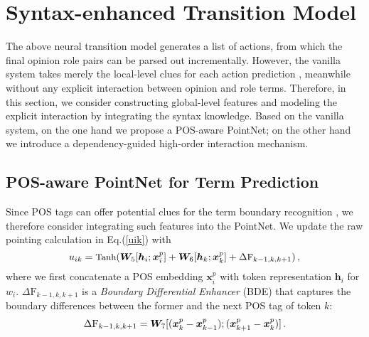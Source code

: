 \documentclass[letterpaper]{article} \usepackage{aaai22}  \usepackage{times}  \usepackage{helvet}  \usepackage{courier}  \usepackage[hyphens]{url}  \usepackage{graphicx} \urlstyle{rm} \def\UrlFont{\rm}  \usepackage{natbib}  \usepackage{caption} \DeclareCaptionStyle{ruled}{labelfont=normalfont,labelsep=colon,strut=off} \frenchspacing  \setlength{\pdfpagewidth}{8.5in}  \setlength{\pdfpageheight}{11in}  \usepackage{algorithm}
\begin{document}
\section{Syntax-enhanced Transition Model}







The above neural transition model generates a list of actions, from which the final opinion role pairs can be parsed out incrementally.
However, the vanilla system takes merely the local-level clues for each action prediction \cite{LiZP20}, meanwhile without any explicit interaction between opinion and role terms.
Therefore, in this section, we consider constructing global-level features and modeling the explicit interaction by integrating the syntax knowledge.
Based on the vanilla system, on the one hand we propose a POS-aware PointNet; on the other hand we introduce a dependency-guided high-order interaction mechanism.




 
\subsection{POS-aware PointNet for Term Prediction}

Since POS tags can offer potential clues for the term boundary recognition \cite{NieTSAW20,Wu0RJL21}, we therefore consider integrating such features into the PointNet.
We update the raw pointing calculation in Eq.(\ref{uik}) with
\begin{equation}\small
\setlength\abovedisplayskip{3pt}
\setlength\belowdisplayskip{3pt}
\label{pos-guided ptr} u_{ik} = \text{Tanh}(\bm{W}_5[\bm{h}_i;\bm{x}_{i}^{p}] +  \bm{W}_6 [\bm{h}_k;\bm{x}_{k}^{p}]  + \Delta\text{F}_{k-1, k, k+1}) \,,
\end{equation} 
where we first concatenate a POS embedding $\bm{x}_{i}^{p}$ with token representation $\bm{h}_i$ for $w_i$. 
$\Delta\text{F}_{k-1, k, k+1}$ is a \emph{Boundary Differential Enhancer} (BDE) that captures the boundary differences between the former and the next POS tag of token $k$:
\begin{equation}
\setlength\abovedisplayskip{3pt}
\setlength\belowdisplayskip{3pt}
\label{BDE} \Delta\text{F}_{k-1, k, k+1} =  \bm{W}_7[(\bm{x}_{k}^{p}-\bm{x}_{k-1}^{p});(\bm{x}_{k+1}^{p}-\bm{x}_{k}^{p})] \,.
\end{equation}
\end{document}

